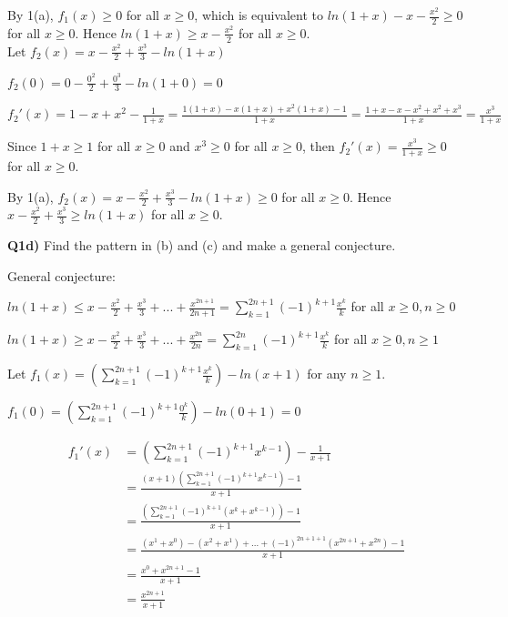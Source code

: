 \documentclass[9pt]{article}
\begin{document}
By 1(a), $f_1(x) \geq 0$ for all $x \geq 0$, which is equivalent to $ln(1 + x) - x - \frac{x^2}{2} \geq 0$ for all $x \geq 0$. Hence $ln(1 + x) \geq x - \frac{x^2}{2}$ for all $x \geq 0$.
\\

Let $f_2(x) = x - \frac{x^2}{2} + \frac{x^3}{3} - ln(1 + x)$

$f_2(0) = 0 - \frac{0^2}{2} + \frac{0^3}{3} - ln(1 + 0) = 0$

$f_2'(x) = 1 - x + x^2 - \frac{1}{1 + x} = \frac{1(1 + x) - x(1 + x) + x^2 (1 + x) - 1}{1 + x} = \frac{1 + x - x - x^2 + x^2 + x^3}{1 + x} = \frac{x^3}{1 + x}$

Since $1 + x \geq 1$ for all $x \geq 0$ and $x^3 \geq 0$ for all $x \geq 0$, then $f_2'(x) = \frac{x^3}{1 + x} \geq 0$ for all $x \geq 0$.

By 1(a), $f_2(x) = x - \frac{x^2}{2} + \frac{x^3}{3} - ln(1 + x) \geq 0$ for all $x \geq 0$. Hence $x - \frac{x^2}{2} + \frac{x^3}{3} \geq ln(1 + x)$ for all $x \geq 0$.


\begin{tcolorbox}
  \textbf{Q1d)} Find the pattern in (b) and (c) and make a general conjecture.
\end{tcolorbox}

General conjecture:

$ln(1 + x) \leq x - \frac{x^2}{2} + \frac{x^3}{3} + ... + \frac{x^{2n + 1}}{2n + 1} = \sum\limits_{k=1}^{2n + 1} (-1)^{k+1} \frac{x^k}{k}$ for all $x \geq 0, n \geq 0$

$ln(1 + x) \geq x - \frac{x^2}{2} + \frac{x^3}{3} + ... + \frac{x^{2n}}{2n} = \sum\limits_{k=1}^{2n} (-1)^{k+1} \frac{x^k}{k}$ for all $x \geq 0, n \geq 1$

Let $f_1(x) = (\sum\limits_{k=1}^{2n + 1} (-1)^{k+1} \frac{x^k}{k}) - ln(x + 1)$ for any $n \geq 1$.

$f_1(0) = (\sum\limits_{k=1}^{2n + 1} (-1)^{k+1} \frac{0^k}{k}) - ln(0 + 1) = 0$

\begin{align*}
  f_1'(x) &= (\sum\limits_{k=1}^{2n + 1} (-1)^{k+1} x^{k-1}) - \frac{1}{x + 1} \\
          &= \frac{(x+1)(\sum\limits_{k=1}^{2n + 1} (-1)^{k+1} x^{k-1}) - 1}{x + 1} \\
          &= \frac{(\sum\limits_{k=1}^{2n + 1} (-1)^{k+1} (x^k + x^{k - 1})) - 1}{x + 1} \\
          &= \frac{(x^1 + x^0) - (x^2 + x^1) + ... + (-1)^{2n + 1 + 1}(x^{2n + 1} + x^{2n}) - 1}{x + 1} \\
          &= \frac{x^0 + x^{2n + 1} - 1}{x + 1} \\
          &= \frac{x^{2n + 1}}{x + 1}
\end{align*}
\end{document}
